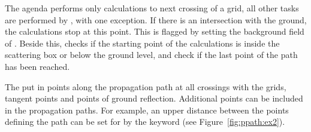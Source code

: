 The agenda performs only calculations to next crossing of a grid, all
other tasks are performed by , with one exception.
If there is an intersection with the ground, the calculations stop at
this point. This is flagged by setting the background field of
. Beside this,  checks if
the starting point of the calculations is inside the scattering box or
below the ground level, and check if the last point of the path has
been reached. 

The  put in points along the
propagation path at all crossings with the grids, tangent points and
points of ground reflection. Additional points can be included in the
propagation paths. For example, an upper distance between the points
defining the path can be set for  by
the keyword  (see Figure~\ref{fig:ppath:ex2}).



\label{sec:ppath:Ppath}

